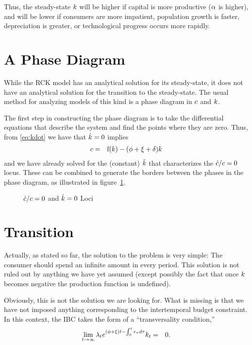 \documentclass{handout}
\begin{document}
Thus, the steady-state ${k}$ will be higher if capital 
is more productive ($\alpha$ is higher), and will be lower if 
consumers are more impatient, population growth is faster, 
depreciation is greater, or technological progress occurs more rapidly.

\section{A Phase Diagram}

While the RCK model has an analytical solution for its steady-state,
it does not have an analytical solution for the transition to the 
steady-state.  The usual method for analyzing
models of this kind is a phase diagram in $c$ and ${k}$.  

The first step in constructing the phase diagram is to take the differential
equations that describe the system and find the points where they are 
zero.  Thus, from \eqref{eq:kdot} we have that $\dot{{k}}=0$ implies
\begin{eqnarray}
        c & = & \mathrm{f}({k}) - (\phi +\xi+\delta) {k} \label{eq:kdotEq0}
\end{eqnarray}
and we have already solved for the (constant) $\check{{k}}$ that characterizes
the $\dot{c}/c=0$ locus.  These can be combined to generate the borders between
the phases in the phase diagram, as illustrated in figure~\ref{fig:RamseySSPlot}.
\begin{figure}
\caption{$\dot{c}/c =0 $ and $\dot{{k}}=0$ Loci}\label{fig:RamseySSPlot}
\end{figure}



\section{Transition}

Actually, as stated so far, the solution to the problem is very simple: The
consumer should spend an infinite amount in every period.  This solution is 
not ruled out by anything we have yet assumed (except possibly the fact that
once ${k}$ becomes negative the production function is undefined).  

Obviously, this is not the solution we are looking for.  What is missing is
that we have not imposed anything corresponding to the intertemporal 
budget constraint.  In this context, the IBC takes the form of a ``transversality
condition,'' 
\begin{eqnarray}
  \label{eq:tvc}
  \lim_{t \rightarrow \infty} \lambda_{t} e^{(\phi +\xi) t - \int_{0}^{t} r_{\tau} d\tau }k_{t} & = & 0.
\end{eqnarray}
\end{document}
